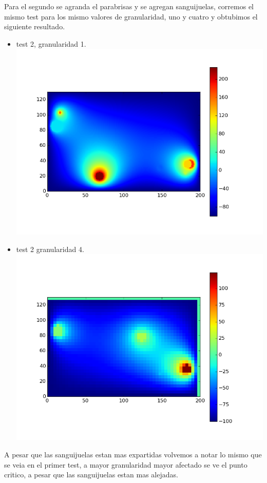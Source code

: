 Para el segundo se agranda el parabrisas y se agregan sanguijuelas, corremos el mismo test para los mismo valores de granularidad, uno y cuatro y obtubimos el siguiente resultado.
\begin{itemize}
 \item test 2, granularidad 1.\\
  \includegraphics[width=400pt]{imagenes/testpropios/test21.png}

 \item test 2 granularidad 4.\\
  \includegraphics[width=400pt]{imagenes/testpropios/test24.png}
\end{itemize}
A pesar que las sanguijuelas estan mas expartidas volvemos a notar lo mismo que se veia en el primer test, a mayor granularidad mayor afectado se ve el punto critico, a pesar que las sanguijuelas estan mas alejadas.

